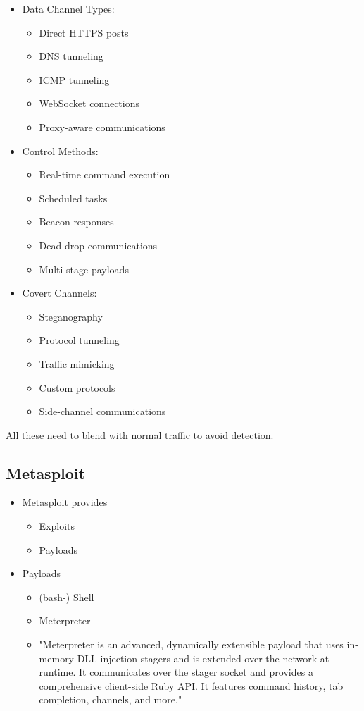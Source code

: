 \begin{itemize}
\item Data Channel Types:
  \begin{itemize}
    \tightlist
    \item Direct HTTPS posts
    \item DNS tunneling
    \item ICMP tunneling
    \item WebSocket connections
    \item Proxy-aware communications
  \end{itemize}

\item Control Methods:
  \begin{itemize}
    \tightlist
    \item Real-time command execution
    \item Scheduled tasks
    \item Beacon responses
    \item Dead drop communications
    \item Multi-stage payloads
  \end{itemize}

\item Covert Channels:
  \begin{itemize}
  \tightlist
	\item Steganography
	\item Protocol tunneling
	\item Traffic mimicking
	\item Custom protocols
	\item Side-channel communications
  \end{itemize}
\end{itemize}
All these need to blend with normal traffic to avoid detection.

\subsection{Metasploit}
\begin{itemize}
\item Metasploit provides
  \begin{itemize}
    \tightlist
    \item Exploits
    \item Payloads
  \end{itemize}
  \item Payloads
  \begin{itemize}
    \tightlist
    \item (bash-) Shell
    \item Meterpreter
    \item "Meterpreter is an advanced, dynamically extensible payload that uses in-memory DLL injection stagers and is extended over the network at runtime. It communicates over the stager socket and provides a comprehensive client-side Ruby API. It features command history, tab completion, channels, and more."
  \end{itemize}
\end{itemize}

